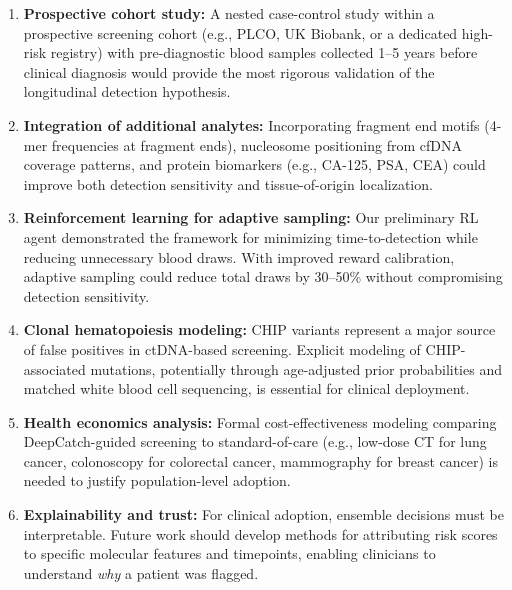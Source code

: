 \documentclass[10pt,a4paper]{article}
\begin{document}
\begin{enumerate}
\item \textbf{Prospective cohort study:} A nested case-control study within a prospective screening cohort (e.g., PLCO, UK Biobank, or a dedicated high-risk registry) with pre-diagnostic blood samples collected 1--5 years before clinical diagnosis would provide the most rigorous validation of the longitudinal detection hypothesis.

\item \textbf{Integration of additional analytes:} Incorporating fragment end motifs (4-mer frequencies at fragment ends), nucleosome positioning from cfDNA coverage patterns, and protein biomarkers (e.g., CA-125, PSA, CEA) could improve both detection sensitivity and tissue-of-origin localization.

\item \textbf{Reinforcement learning for adaptive sampling:} Our preliminary RL agent demonstrated the framework for minimizing time-to-detection while reducing unnecessary blood draws. With improved reward calibration, adaptive sampling could reduce total draws by 30--50\% without compromising detection sensitivity.

\item \textbf{Clonal hematopoiesis modeling:} CHIP variants represent a major source of false positives in ctDNA-based screening. Explicit modeling of CHIP-associated mutations, potentially through age-adjusted prior probabilities and matched white blood cell sequencing, is essential for clinical deployment.

\item \textbf{Health economics analysis:} Formal cost-effectiveness modeling comparing DeepCatch-guided screening to standard-of-care (e.g., low-dose CT for lung cancer, colonoscopy for colorectal cancer, mammography for breast cancer) is needed to justify population-level adoption.

\item \textbf{Explainability and trust:} For clinical adoption, ensemble decisions must be interpretable. Future work should develop methods for attributing risk scores to specific molecular features and timepoints, enabling clinicians to understand \textit{why} a patient was flagged.
\end{enumerate}

\end{document}
